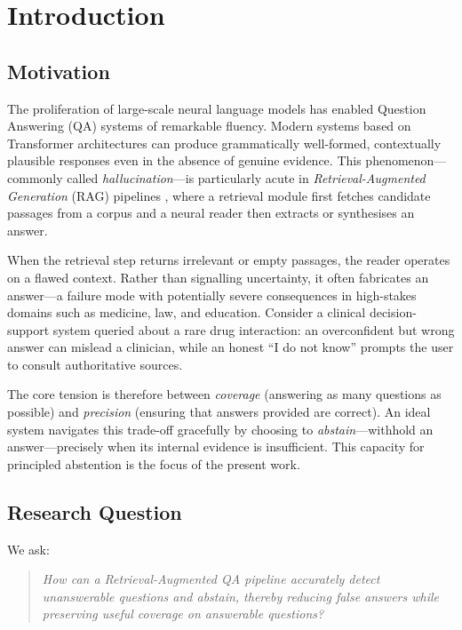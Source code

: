 \chapter{Introduction}
\label{chap:introduction}

\section{Motivation}
\label{sec:intro_motivation}

The proliferation of large-scale neural language models has enabled Question
Answering (QA) systems of remarkable fluency. Modern systems based on
Transformer architectures \cite{devlin2019bert,liu2019roberta} can produce
grammatically well-formed, contextually plausible responses even in the absence
of genuine evidence. This phenomenon—commonly called \emph{hallucination}—is
particularly acute in \emph{Retrieval-Augmented Generation} (RAG) pipelines
\cite{lewis2020rag}, where a retrieval module first fetches candidate passages
from a corpus and a neural reader then extracts or synthesises an answer.

When the retrieval step returns irrelevant or empty passages, the reader
operates on a flawed context. Rather than signalling uncertainty, it often
fabricates an answer—a failure mode with potentially severe consequences in
high-stakes domains such as medicine, law, and education. Consider a clinical
decision-support system queried about a rare drug interaction: an overconfident
but wrong answer can mislead a clinician, while an honest ``I do not know''
prompts the user to consult authoritative sources.

The core tension is therefore between \emph{coverage} (answering as many
questions as possible) and \emph{precision} (ensuring that answers provided are
correct). An ideal system navigates this trade-off gracefully by choosing to
\emph{abstain}—withhold an answer—precisely when its internal evidence is
insufficient. This capacity for principled abstention is the focus of the
present work.

\section{Research Question}
\label{sec:intro_rq}

We ask:

\begin{quote}
  \textit{How can a Retrieval-Augmented QA pipeline accurately detect
  unanswerable questions and abstain, thereby reducing false answers while
  preserving useful coverage on answerable questions?}
\end{quote}

